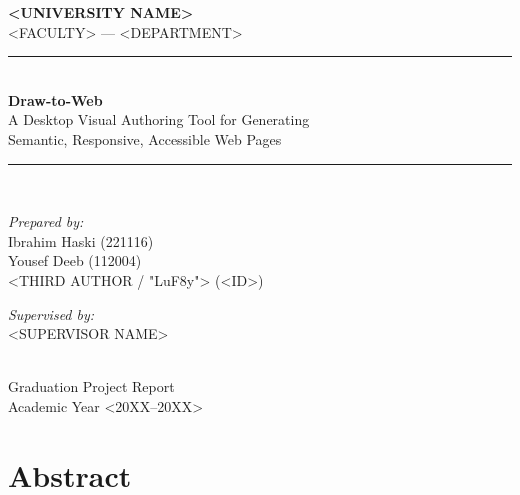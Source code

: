 \documentclass[12pt,a4paper,oneside]{report}
\begin{document}
\begin{titlepage}
  \centering
  {\Large \textbf{<UNIVERSITY NAME>}}\\[0.3cm]
  {\large <FACULTY> --- <DEPARTMENT>}\\[2.5cm]

  \rule{\linewidth}{0.4mm}\\[0.6cm]
  {\huge \bfseries Draw-to-Web}\\[0.3cm]
  {\Large A Desktop Visual Authoring Tool for Generating\\[0.2cm]
   Semantic, Responsive, Accessible Web Pages}\\[0.4cm]
  \rule{\linewidth}{0.4mm}\\[1.5cm]

  \begin{minipage}{0.45\textwidth}
    \begin{flushleft}\large
      \textit{Prepared by:}\\
      Ibrahim Haski \quad (221116)\\
      Yousef Deeb \quad (112004)\\
      <THIRD AUTHOR / "LuF8y"> \quad (<ID>)\\
    \end{flushleft}
  \end{minipage}
  \hfill
  \begin{minipage}{0.45\textwidth}
    \begin{flushright}\large
      \textit{Supervised by:}\\
      <SUPERVISOR NAME>\\
    \end{flushright}
  \end{minipage}\\[3cm]

  {\large Graduation Project Report}\\[0.3cm]
  {\large Academic Year <20XX--20XX>}\\[0.5cm]
  \vfill
\end{titlepage}


\chapter*{Abstract}

\end{document}
